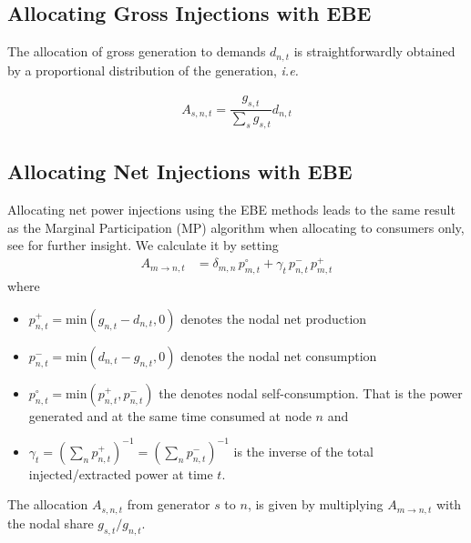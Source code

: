 \documentclass[11pt,twocolumn]{article}
\newcommand{\ie}{\textit{i.e.} }
\newcommand{\generation}{g_{s,t}}
\newcommand{\nodalgeneration}[1][n]{g_{#1,t}}
\newcommand{\demand}[1][n]{d_{#1,t}}
\newcommand{\nodaldemand}[1][n]{d_{#1,t}}
\newcommand{\injection}{p_{n,t}}
\newcommand{\netconsumption}[1][n]{p^{-}_{#1,t}}
\newcommand{\netproduction}[1][n]{p^{+}_{#1,t}}
\newcommand{\selfconsumption}[1][n]{p^{\circ}_{#1,t}}
\newcommand{\allocategeneration}[1][s, n]{A_{#1,t}}
\newcommand{\allocatepeer}[1][m \rightarrow n]{A_{#1,t}}
\begin{document}
\subsection{Allocating Gross Injections with EBE}
\label{sec:gross_ebe}

The allocation of gross generation to demands $\demand$ is straightforwardly obtained by a proportional distribution of the generation, \ie

\begin{align}
    \allocategeneration = \dfrac{\generation}{\sum_s \generation} \demand 
\end{align}


\subsection{Allocating Net Injections with EBE}
\label{sec:net_ebe}

Allocating net power injections using the EBE methods leads to the same result as the Marginal Participation (MP) \cite{rudnick_marginal_1995}  algorithm when allocating to consumers only, see \cite{hofmann_flow_2020-1} for further insight. We calculate it by setting 
\begin{align}
\allocatepeer &=  \delta_{m,n}\,\selfconsumption[m] + \gamma_t \, \netconsumption  \, \netproduction[m]
\label{eq:mp_slack}
\end{align}
where 
\begin{itemize}
\item $\netproduction = \text{min}\left( \nodalgeneration - \nodaldemand , 0 \right) $ denotes the nodal net production 
\item $\netconsumption = \text{min}\left( \nodaldemand  - \nodalgeneration, 0 \right)$ denotes the nodal net consumption
\item $\selfconsumption = \text{min}\left( \netproduction, \netconsumption \right)$ the denotes  nodal self-consumption. That is the power generated and at the same time consumed at node $n$ and 
\item $\gamma_t = \left( \sum_n \netproduction\right) ^{-1} = \left( \sum_n \netconsumption\right) ^{-1}$ is the inverse of the total injected/extracted power at time $t$.
\end{itemize}

The allocation $\allocategeneration$ from generator $s$ to $n$, is given by multiplying $\allocatepeer$ with the nodal share $\generation / \nodalgeneration$.
\end{document}
